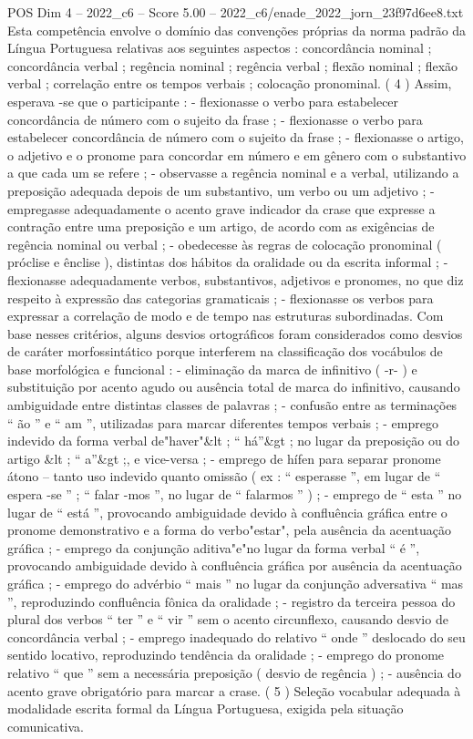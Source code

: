 \begin{textsample}{POS Dim 4 – 2022\_c6 – Score 5.00 – 2022\_c6/enade\_2022\_jorn\_23f97d6ee8.txt}
Esta competência envolve o domínio das convenções próprias da norma padrão da Língua Portuguesa relativas aos seguintes aspectos : concordância nominal ; concordância verbal ; regência nominal ; regência verbal ; flexão nominal ; flexão verbal ; correlação entre os tempos verbais ; colocação pronominal. ( 4 ) Assim, esperava -se que o participante : - flexionasse o verbo para estabelecer concordância de número com o sujeito da frase ; - flexionasse o verbo para estabelecer concordância de número com o sujeito da frase ; - flexionasse o artigo, o adjetivo e o pronome para concordar em número e em gênero com o substantivo a que cada um se refere ; - observasse a regência nominal e a verbal, utilizando a preposição adequada depois de um substantivo, um verbo ou um adjetivo ; - empregasse adequadamente o acento grave indicador da crase que expresse a contração entre uma preposição e um artigo, de acordo com as exigências de regência nominal ou verbal ; - obedecesse às regras de colocação pronominal ( próclise e ênclise ), distintas dos hábitos da oralidade ou da escrita informal ; - flexionasse adequadamente verbos, substantivos, adjetivos e pronomes, no que diz respeito à expressão das categorias gramaticais ; - flexionasse os verbos para expressar a correlação de modo e de tempo nas estruturas subordinadas.
Com base nesses critérios, alguns desvios ortográficos foram considerados como desvios de caráter morfossintático porque interferem na classificação dos vocábulos de base morfológica e funcional : - eliminação da marca de infinitivo ( -r- ) e substituição por acento agudo ou ausência total de marca do infinitivo, causando ambiguidade entre distintas classes de palavras ; - confusão entre as terminações “ ão ” e “ am ”, utilizadas para marcar diferentes tempos verbais ; - emprego indevido da forma verbal de"haver"\&lt ; “ há”\&gt ; no lugar da preposição ou do artigo \&lt ; “ a”\&gt ;, e vice-versa ; - emprego de hífen para separar pronome átono – tanto uso indevido quanto omissão ( ex : “ esperasse ”, em lugar de “ espera -se ” ; “ falar -mos ”, no lugar de “ falarmos ” ) ; - emprego de “ esta ” no lugar de “ está ”, provocando ambiguidade devido à confluência gráfica entre o pronome demonstrativo e a forma do verbo"estar", pela ausência da acentuação gráfica ; - emprego da conjunção aditiva"e"no lugar da forma verbal “ é ”, provocando ambiguidade devido à confluência gráfica por ausência da acentuação gráfica ; - emprego do advérbio “ mais ” no lugar da conjunção adversativa “ mas ”, reproduzindo confluência fônica da oralidade ; - registro da terceira pessoa do plural dos verbos “ ter ” e “ vir ” sem o acento circunflexo, causando desvio de concordância verbal ; - emprego inadequado do relativo “ onde ” deslocado do seu sentido locativo, reproduzindo tendência da oralidade ; - emprego do pronome relativo “ que ” sem a necessária preposição ( desvio de regência ) ; - ausência do acento grave obrigatório para marcar a crase. ( 5 ) Seleção vocabular adequada à modalidade escrita formal da Língua Portuguesa, exigida pela situação comunicativa.

\end{textsample}

